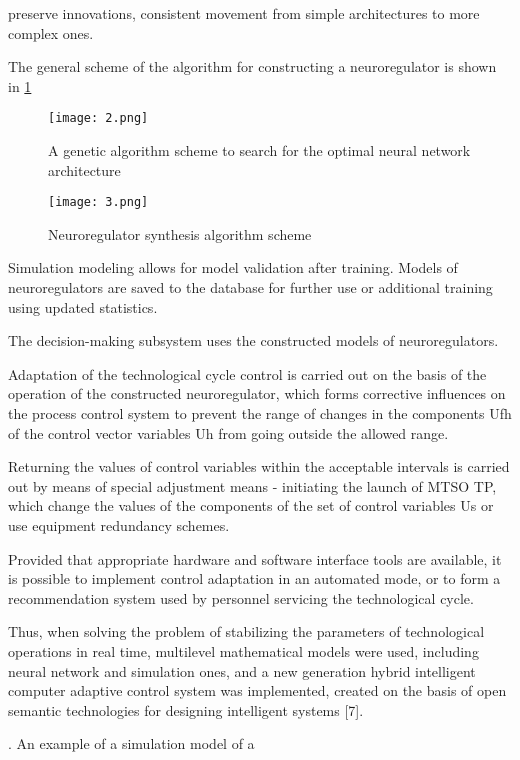\documentclass{article}
\newcommand{\RomanNumeralCaps}[1]
    {\MakeUppercase{\romannumeral #1}}
\begin{document}
\begin{multicols}{2}
preserve innovations, consistent movement from simple
architectures to more complex ones.\par
The general scheme of the algorithm for constructing
a neuroregulator is shown in  \ref{Figure3}\par
\begin{figure}[H]
    \centering
    \texttt{[image: 2.png]}
    \caption{{\small A genetic algorithm scheme to search for the optimal neural
network architecture}}
 \end{figure}
 \begin{figure}[H]
    \centering
    \texttt{[image: 3.png]}
    \caption{ {\small Neuroregulator synthesis algorithm scheme}\label{Figure3}}
 \end{figure}\vspace{-5pt}
 Simulation modeling allows for model validation after
training. Models of neuroregulators are saved to the
database for further use or additional training using
updated statistics.\par
The decision-making subsystem uses the constructed
models of neuroregulators.\par
Adaptation of the technological cycle control is carried
out on the basis of the operation of the constructed
neuroregulator, which forms corrective influences on the
process control system to prevent the range of changes
in the components Ufh of the control vector variables
Uh from going outside the allowed range.\par
Returning the values of control variables within the
acceptable intervals is carried out by means of special
adjustment means - initiating the launch of MTSO TP,
which change the values of the components of the set
of control variables Us or use equipment redundancy
schemes.\par
Provided that appropriate hardware and software interface tools are available, it is possible to implement
control adaptation in an automated mode, or to form a
recommendation system used by personnel servicing the
technological cycle.\par
Thus, when solving the problem of stabilizing the
parameters of technological operations in real time, multilevel mathematical models were used, including neural
network and simulation ones, and a new generation
hybrid intelligent computer adaptive control system was
implemented, created on the basis of open semantic
technologies for designing intelligent systems [7].
\begin{center}
\RomanNumeralCaps{6.} An example of a simulation model of a

\end{center}
\end{multicols}
\end{document}
